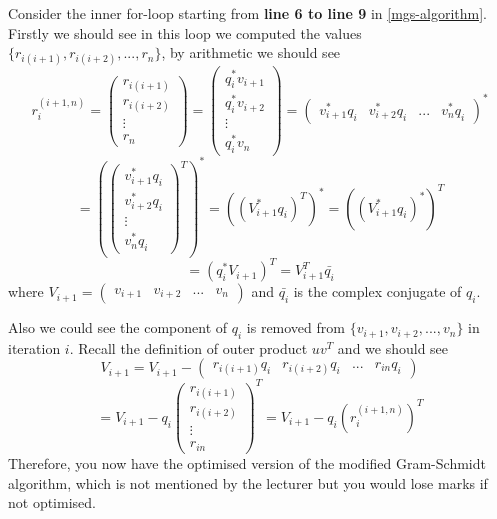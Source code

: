 \newpage
\noindent Consider the inner for-loop starting from \textbf{line 6 to line 9} in \autoref{mgs-algorithm}. Firstly we should see in this loop we computed the values \(\{r_{i(i + 1)}, r_{i(i + 2)}, ..., r_n\}\), by arithmetic we should see
\[
  r_i^{(i + 1, n)} = \begin{pmatrix} 
    r_{i(i + 1)} \\ r_{i(i + 2)} \\ \vdots \\ r_n
  \end{pmatrix}
  = 
  \begin{pmatrix} 
      q_i^{*}v_{i + 1} \\
      q_i^{*}v_{i + 2} \\
      \vdots \\
      q_i^{*}v_{n}
  \end{pmatrix}
  = \begin{pmatrix} 
     v_{i + 1}^{*}q_i & v_{i + 2}^{*}q_i & ... & v_{n}^{*}q_i
  \end{pmatrix}^{*}
\]
\[
  =
  (\begin{pmatrix} 
    v_{i + 1}^{*}q_i \\
    v_{i + 2}^{*}q_i \\
    \vdots \\
    v_{n}^{*}q_i
\end{pmatrix}^{T})^{*}
  = ((V_{i + 1}^{*}q_i)^{T})^{*} = ((V_{i + 1}^{*}q_i)^{*})^{T} 
\]
\[
  = (q_i^{*}V_{i + 1})^{T} = V_{i + 1}^{T}\bar{q_i}
\]
where \(V_{i + 1} = \begin{pmatrix} 
    v_{i + 1} & v_{i + 2} & ... & v_{n}
\end{pmatrix} \)  and \(\bar{q_i}\) is the complex conjugate of \(q_i\). \medskip

\noindent Also we could see the component of \(q_i\)  is removed from \(\{v_{i + 1}, v_{i + 2}, ..., v_{n}\} \) in iteration \(i\). Recall the definition of outer product \(uv^{T}\) and we should see
\[
  V_{i + 1} = V_{i + 1}
  - \begin{pmatrix} 
    r_{i(i + 1)}q_i & r_{i(i + 2)}q_i & ... & r_{in}q_i 
  \end{pmatrix} 
\]
\[
  = V_{i + 1} - q_i \begin{pmatrix} 
    r_{i(i + 1)} \\
    r_{i(i + 2)} \\
    \vdots \\
    r_{in}
  \end{pmatrix}^{T}
  = V_{i + 1} - q_i (r_i^{(i + 1, n)})^{T}
\]
Therefore, you now have the optimised version of the modified Gram-Schmidt algorithm, which is not mentioned by the lecturer but you would lose marks if not optimised.

